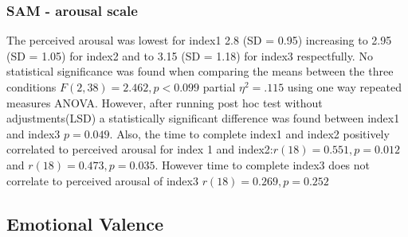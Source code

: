 \documentclass[a4paper]{report}
\begin{document}
			\subsubsection{SAM - arousal scale}
			The perceived arousal was lowest for index1 2.8 (SD = 0.95) increasing to 2.95 (SD = 1.05) for index2 and to 3.15 (SD = 1.18) for index3 respectfully. No statistical significance was found when comparing the means between the three conditions $F(2,38)=2.462, p<0.099$ partial $\eta^{2}=.115$ using one way repeated measures ANOVA. However, after running post hoc test without adjustments(LSD) a statistically significant difference was found between index1 and index3 $p=0.049$.
			Also, the time to complete index1 and index2 positively correlated to perceived arousal for index 1 and index2:$r(18)=0.551, p=0.012$ and $r(18)=0.473, p=0.035$. However time to complete index3 does not correlate to perceived arousal of index3 $r(18)=0.269, p=0.252$
			
		\subsection{Emotional Valence}
\end{document}

